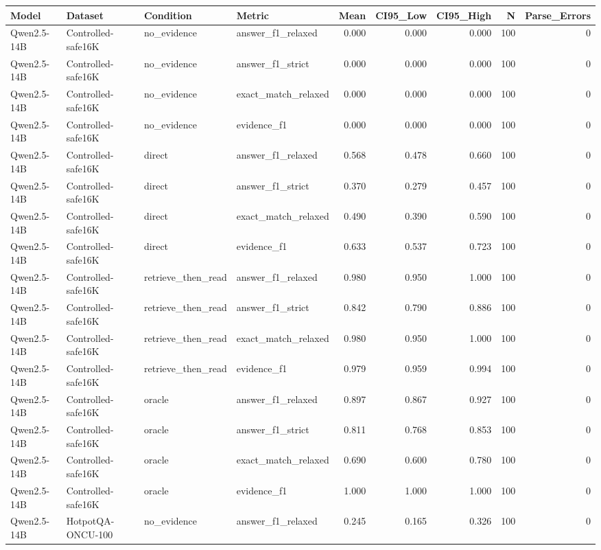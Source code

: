 \begin{tabular}{llllrrrrr}
\toprule
Model & Dataset & Condition & Metric & Mean & CI95_Low & CI95_High & N & Parse_Errors \\
\midrule
Qwen2.5-14B & Controlled-safe16K & no_evidence & answer_f1_relaxed & 0.000 & 0.000 & 0.000 & 100 & 0 \\
Qwen2.5-14B & Controlled-safe16K & no_evidence & answer_f1_strict & 0.000 & 0.000 & 0.000 & 100 & 0 \\
Qwen2.5-14B & Controlled-safe16K & no_evidence & exact_match_relaxed & 0.000 & 0.000 & 0.000 & 100 & 0 \\
Qwen2.5-14B & Controlled-safe16K & no_evidence & evidence_f1 & 0.000 & 0.000 & 0.000 & 100 & 0 \\
Qwen2.5-14B & Controlled-safe16K & direct & answer_f1_relaxed & 0.568 & 0.478 & 0.660 & 100 & 0 \\
Qwen2.5-14B & Controlled-safe16K & direct & answer_f1_strict & 0.370 & 0.279 & 0.457 & 100 & 0 \\
Qwen2.5-14B & Controlled-safe16K & direct & exact_match_relaxed & 0.490 & 0.390 & 0.590 & 100 & 0 \\
Qwen2.5-14B & Controlled-safe16K & direct & evidence_f1 & 0.633 & 0.537 & 0.723 & 100 & 0 \\
Qwen2.5-14B & Controlled-safe16K & retrieve_then_read & answer_f1_relaxed & 0.980 & 0.950 & 1.000 & 100 & 0 \\
Qwen2.5-14B & Controlled-safe16K & retrieve_then_read & answer_f1_strict & 0.842 & 0.790 & 0.886 & 100 & 0 \\
Qwen2.5-14B & Controlled-safe16K & retrieve_then_read & exact_match_relaxed & 0.980 & 0.950 & 1.000 & 100 & 0 \\
Qwen2.5-14B & Controlled-safe16K & retrieve_then_read & evidence_f1 & 0.979 & 0.959 & 0.994 & 100 & 0 \\
Qwen2.5-14B & Controlled-safe16K & oracle & answer_f1_relaxed & 0.897 & 0.867 & 0.927 & 100 & 0 \\
Qwen2.5-14B & Controlled-safe16K & oracle & answer_f1_strict & 0.811 & 0.768 & 0.853 & 100 & 0 \\
Qwen2.5-14B & Controlled-safe16K & oracle & exact_match_relaxed & 0.690 & 0.600 & 0.780 & 100 & 0 \\
Qwen2.5-14B & Controlled-safe16K & oracle & evidence_f1 & 1.000 & 1.000 & 1.000 & 100 & 0 \\
Qwen2.5-14B & HotpotQA-ONCU-100 & no_evidence & answer_f1_relaxed & 0.245 & 0.165 & 0.326 & 100 & 0 \\

\end{tabular}

